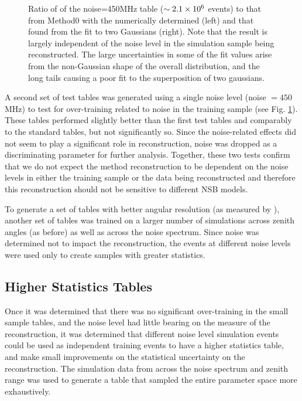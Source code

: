 \documentclass[main.tex]{subfiles}
\begin{document}
\begin{figure}[htbp]
  \centering

  \caption[\disp table reconstruction vs noise.]{Ratio of \rse of the noise=450MHz \disp table ($\sim 2.1\times 10^{6}$ events) to that from Method0 with the numerically determined \rse (left) and that found from the fit to two Gaussians (right). Note that the result is largely independent of the noise level in the simulation sample being reconstructed. The large uncertainties in some of the fit values arise from the non-Gaussian shape of the overall distribution, and the long tails causing a poor fit to the superposition of two gaussians.}
  \label{fig:disp_ratio_450}
\end{figure}

A second set of test \disp tables was generated using a single noise level (noise $= 450$ MHz) to test for over-training related to noise in the training sample (see Fig. \ref{fig:disp_ratio_450}). These tables performed slightly better than the first test tables and comparably to the standard \disp tables, but not significantly so. Since the noise-related effects did not seem to play a significant role in reconstruction, noise was dropped as a discriminating parameter for further analysis. Together, these two tests confirm that we do not expect the \disp method reconstruction to be dependent on the noise levels in either the training sample or the data being reconstructed and therefore this reconstruction should not be sensitive to different NSB models.

To generate a set of \disp tables with better angular resolution (as measured by \rse\hspace{-4pt}), another set of \disp tables was trained on a larger number of simulations across zenith angles (as before) as well as across the noise spectrum. Since noise was determined not to impact the reconstruction, the events at different noise levels were used only to create samples with greater statistics.

\subsection{Higher Statistics Tables}
Once it was determined that there was no significant over-training in the small sample \disp tables, and the noise level had little bearing on the \rse measure of the reconstruction, it was determined that different noise level simulation events could be used as independent training events to have a higher statistics \disp table, and make small improvements on the statistical uncertainty on the reconstruction. The simulation data from across the noise spectrum and zenith range was used to generate a \disp table that sampled the entire parameter space more exhaustively.
\end{document}
